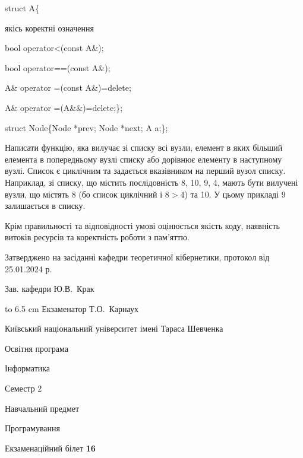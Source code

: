 \documentclass[12pt, ukrainian]{article}
\begin{document}
{struct A\{

\quad  якісь коректні означення 

\quad  bool operator<(const A\&); 

\quad  bool operator==(const A\&); 

\quad A\& operator =(const A\&)=delete; 

\quad  A\& operator =(A\&\&)=delete;\};

struct Node\{Node *prev; Node *next; A a;\};

Написати функцію, яка вилучає зі списку всі вузли, елемент в яких більший елемента в попередньому вузлі списку або дорівнює елементу в наступному вузлі. Список є циклічним та задається вказівником на перший вузол списку. Наприклад, зі списку, що містить послідовність 8, 10, 9, 4, мають бути вилучені вузли, що містять 8 (бо список циклічний і $8>4$) та 10. У цьому прикладі 9 залишається в списку.

Крім правильності та відповідності умові оцінюється якість коду, наявність витоків ресурсів та коректність роботи з пам'яттю. 

}
{\smallskip\smallskip \begin {scriptsize} Затверджено на засіданні кафедри теоретичної кібернетики, протокол   від   25.01.2024 р.\par\smallskip\smallskip\smallskip\smallskip
{\parbox {6.5 cm} {Зав. кафедри \dotfill Ю.В.~Крак}}\hspace {0.7cm} {\hbox to 6.5 cm { Екзаменатор \dotfill Т.О.~Карнаух}} \end{scriptsize}}
\newpage
{{\begin {scriptsize}\par
{ \center  Київський національний університет імені Тараса Шевченка \par}
{\parbox {5 cm}{Освітня програма \hfill}{\parbox {7 cm}{Інформатика\hfill}}\parbox {6 cm}{\hfill Семестр 2}}\par
{\parbox {5 cm} {Навчальний предмет \hfill}\parbox {7 cm}{Програмування \hfill}\parbox {6cm}{\hfill}\par}\vspace{-15pt} \end{scriptsize}}{\center Екзаменаційний білет \No \textbf { 16 }\par}}
\end{document}
